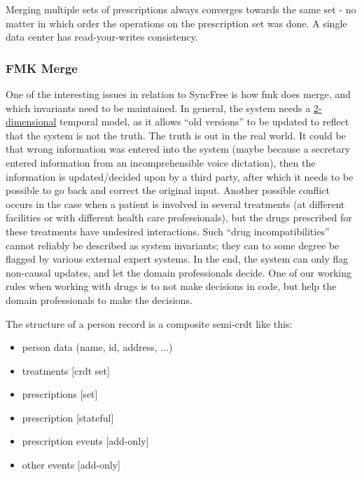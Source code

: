 \documentclass[11pt,a4paper]{report}
\begin{document}
Merging multiple sets of prescriptions always converges towards the same set - no matter in which order the operations on the prescription set was done.
A single data center has read-your-writes consistency.

\subsubsection{FMK Merge}
One of the interesting issues in relation to SyncFree is how \gls{fmk} does merge, and which invariants need to be maintained.
In general, the system needs a \href{http://en.wikipedia.org/wiki/Bitemporal_data}{2-dimensional} temporal model, as it allows ``old versions'' to be updated to reflect that the system is not the truth. The truth is out in the real world. It could be that wrong information was entered into the system (maybe because a secretary entered information from an incomprehensible voice dictation), then the information is updated/decided upon by a third party, after which it needs to be possible to go back and correct the original input. Another possible conflict occurs in the case when a patient is involved in several treatments (at different facilities or with different health care professionals), but the drugs prescribed for these treatments have undesired interactions. Such ``drug incompatibilities'' cannot reliably be described as system invariants; they can to some degree be flagged by various external expert systems. In the end, the system can only flag non-causal updates, and let the domain professionals decide. One of our working rules when working with drugs is to not make decisions in code, but help the domain professionals to make the decisions.

The structure of a person record is a composite semi-\gls{crdt} like this:
\begin{itemize}
	\item person data (name, id, address, ...)
	\item treatments [\gls{crdt} set]
	\item prescriptions [set]
	\item prescription [stateful]
	\item prescription events [add-only]
	\item other events [add-only]
\end{itemize}

\end{document}

